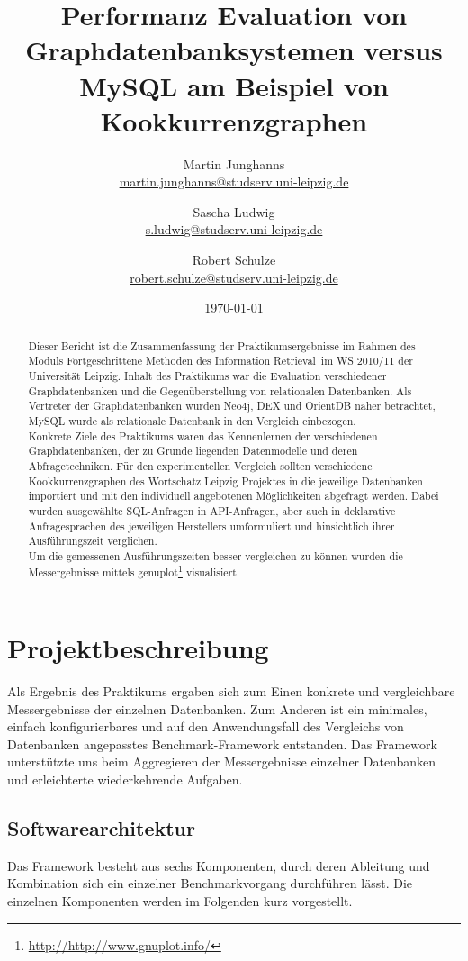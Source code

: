 \documentclass[11pt, a4paper, oneside]{article} %
\author{Martin Junghanns \\  \url{martin.junghanns@studserv.uni-leipzig.de} \and 
		Sascha Ludwig \\ \url{s.ludwig@studserv.uni-leipzig.de} \and 
		Robert Schulze \\ \url{robert.schulze@studserv.uni-leipzig.de} }
\date{\today}
\title{ Performanz Evaluation von Graphdatenbanksystemen versus MySQL am Beispiel von Kookkurrenzgraphen }
\begin{document}
\renewcommand{\labelitemi}{-}

\maketitle

\begin{abstract}
	Dieser Bericht ist die Zusammenfassung der Praktikumsergebnisse im Rahmen des Moduls \dq Fortgeschrittene Methoden des Information Retrieval\dq~im WS 2010/11 der Universität Leipzig. Inhalt des Praktikums war die Evaluation verschiedener Graphdatenbanken und die Gegenüberstellung von relationalen Datenbanken. Als Vertreter der Graphdatenbanken wurden Neo4j, DEX und OrientDB näher betrachtet, MySQL wurde als relationale Datenbank in den Vergleich einbezogen.\\
Konkrete Ziele des Praktikums waren das Kennenlernen der verschiedenen Graphdatenbanken, der zu Grunde liegenden Datenmodelle und deren Abfragetechniken. Für den experimentellen Vergleich sollten verschiedene Kookkurrenzgraphen des Wortschatz Leipzig Projektes in die jeweilige Datenbanken importiert und mit den individuell angebotenen Möglichkeiten abgefragt werden. Dabei wurden ausgewählte SQL-Anfragen in API-Anfragen, aber auch in deklarative Anfragesprachen des jeweiligen Herstellers umformuliert und hinsichtlich ihrer Ausführungszeit verglichen.\\
Um die gemessenen Ausführungszeiten besser vergleichen zu können wurden die Messergebnisse mittels genuplot\footnote{\url{http://http://www.gnuplot.info/}} visualisiert.
\end{abstract}

\section{Projektbeschreibung}
Als Ergebnis des Praktikums ergaben sich zum Einen konkrete und vergleichbare Messergebnisse der einzelnen Datenbanken. Zum Anderen ist ein minimales, einfach konfigurierbares und auf den Anwendungsfall des Vergleichs von Datenbanken angepasstes Benchmark-Framework entstanden. Das Framework unterstützte uns beim Aggregieren der Messergebnisse einzelner Datenbanken und erleichterte wiederkehrende Aufgaben. 
	
\subsection{Softwarearchitektur}
Das Framework besteht aus sechs Komponenten, durch deren Ableitung und Kombination sich ein einzelner Benchmarkvorgang durchführen lässt. Die einzelnen Komponenten werden im Folgenden kurz vorgestellt. 
\end{document}
